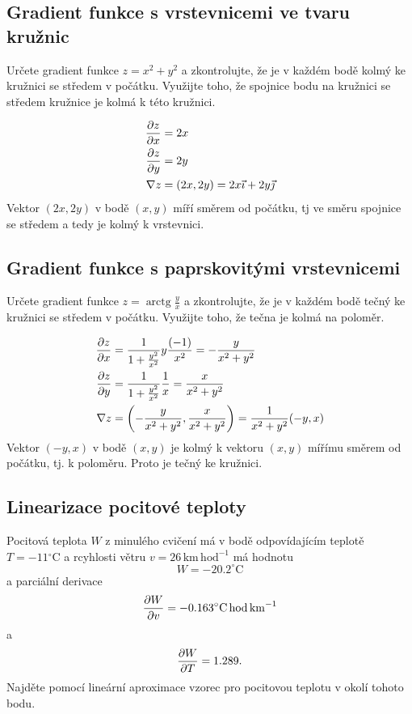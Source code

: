 \subsection{Gradient funkce s vrstevnicemi ve tvaru kružnic}

Určete gradient funkce $z=x^2+y^2$ a zkontrolujte, že je v každém bodě kolmý ke kružnici se středem v počátku. Využijte toho, že spojnice bodu na kružnici se středem kružnice je kolmá k této kružnici. 

\reseni
\begin{align*}
  \pdv{z}{x} &= 2x\\
  \pdv{z}{y} &= 2y\\
  \nabla z &= (2x, 2y) = 2x\vec \imath + 2y\vec \jmath
\end{align*}
Vektor $(2x,2y)$ v bodě $(x,y)$ míří směrem od počátku, tj ve směru spojnice se středem a tedy je kolmý k vrstevnici.
\konec



\subsection{Gradient funkce s paprskovitými vrstevnicemi}

Určete gradient funkce $z=\mathop{\mathrm{arctg}} \frac yx$ a zkontrolujte, že je v každém bodě tečný ke kružnici se středem v počátku. Využijte toho, že tečna je kolmá na poloměr.


\reseni
\begin{align*}
  \pdv{z}{x} &= \frac1{1+\frac {y^2}{x^2}}y\frac {(-1)}{x^2}=-\frac{y}{x^2+y^2}\\
  \pdv{z}{y} &= \frac1{1+\frac {y^2}{x^2}}\frac 1x=\frac{x}{x^2+y^2}\\
  \nabla z &=  \left(-\frac{y}{x^2+y^2},\frac{x}{x^2+y^2}\right)= \frac{1}{x^2+y^2} (-y,x)
\end{align*}
Vektor $(-y,x)$ v bodě $(x,y)$ je kolmý k vektoru $(x,y)$ mířímu směrem od počátku, tj. k poloměru. Proto je tečný ke kružnici.
\konec




\subsection{Linearizace pocitové teploty}

Pocitová teplota $W$ z minulého cvičení má v bodě odpovídajícím teplotě $T=-11{}^\circ\mathrm C$ a rcyhlosti větru $v=26\,\mathrm {km}\,\mathrm{hod}^{-1}$ má hodnotu $$W=-20.2 ^\circ\mathrm C$$ a parciální derivace $$\pdv{W}{v}=-0.163 ^\circ\mathrm C\, \mathrm {hod}\,\mathrm{km}^{-1}$$ a
$$\pdv{W}{T}=1.289.$$ Najděte pomocí lineární aproximace vzorec pro pocitovou teplotu v okolí tohoto bodu.

